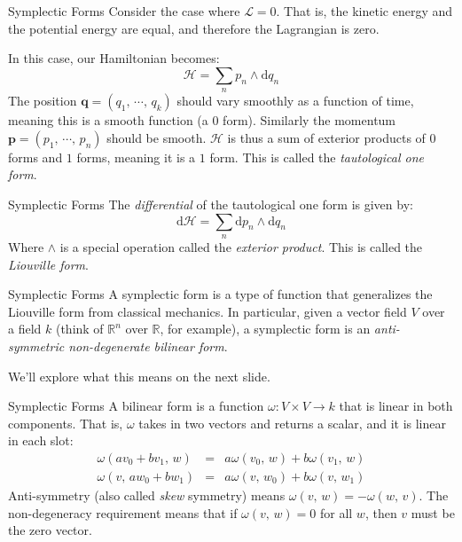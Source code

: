 \documentclass{beamer}
\begin{document}
    \begin{frame}{Symplectic Forms}
        Consider the case where $\mathcal{L}=0$. That is, the kinetic energy and
        the potential energy are equal, and therefore the Lagrangian is zero.
        \par\hfill\par
        In this case, our Hamiltonian becomes:
        \[
            \mathcal{H}
            =\sum_{n}p_{n}\land\textrm{d}q_{n}
        \]
        The position $\mathbf{q}=(q_{1},\,\cdots,\,q_{k})$ should vary smoothly
        as a function of time, meaning this is a smooth function (a 0 form).
        Similarly the momentum $\mathbf{p}=(p_{1},\,\cdots,\,p_{n})$ should be
        smooth. $\mathcal{H}$ is thus a sum of exterior products of $0$ forms
        and $1$ forms, meaning it is a $1$ form. This is called the
        \textit{tautological one form}.
    \end{frame}
    \begin{frame}{Symplectic Forms}
        The \textit{differential} of the tautological one form is given by:
        \[
            \textrm{d}\mathcal{H}
            =\sum_{n}\textrm{d}p_{n}\land\textrm{d}q_{n}
        \]
        Where $\land$ is a special operation called the
        \textit{exterior product}.
        This is called the \textit{Liouville form}.
    \end{frame}
    \begin{frame}{Symplectic Forms}
        A symplectic form is a type of function that generalizes the
        Liouville form from classical mechanics. In particular, given a
        vector field $V$ over a field $k$ (think of $\mathbb{R}^{n}$ over
        $\mathbb{R}$, for example), a symplectic form is an
        \textit{anti-symmetric non-degenerate bilinear form}.
        \par\hfill\par
        We'll explore what this means on the next slide.
    \end{frame}
    \begin{frame}{Symplectic Forms}
        A bilinear form is a function $\omega:V\times{V}\rightarrow{k}$ that
        is linear in both components. That is, $\omega$ takes in two vectors
        and returns a scalar, and it is linear in each slot:
        \begin{equation}
            \begin{array}{rcl}
                \displaystyle
                \omega(av_{0}+bv_{1},\,w)
                &=&
                \displaystyle
                a\omega(v_{0},\,w)+b\omega(v_{1},\,w)\\[1em]
                \displaystyle
                \omega(v,\,aw_{0}+bw_{1})
                &=&
                \displaystyle
                a\omega(v,\,w_{0})+b\omega(v,\,w_{1})
            \end{array}
        \end{equation}
        Anti-symmetry (also called \textit{skew} symmetry) means
        $\omega(v,\,w)=-\omega(w,\,v)$. The non-degeneracy requirement means
        that if $\omega(v,\,w)=0$ for all $w$, then $v$ must be the zero vector.
    \end{frame}
\end{document}
